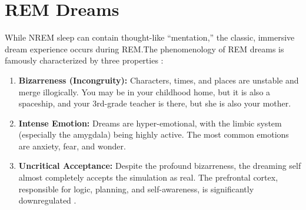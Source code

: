 \section{REM Dreams}\label{sec:rem_dreams}

While NREM sleep can contain thought-like ``mentation,'' the classic, immersive dream experience occurs during REM.\@ The phenomenology of REM dreams is famously characterized by three properties \citep{hobson1977activation}:

\begin{enumerate}
    \item \textbf{Bizarreness (Incongruity):} Characters, times, and places are unstable and merge illogically. You may be in your childhood home, but it is also a spaceship, and your 3rd-grade teacher is there, but she is also your mother.
    \item \textbf{Intense Emotion:} Dreams are hyper-emotional, with the limbic system (especially the amygdala) being highly active. The most common emotions are anxiety, fear, and wonder.
    \item \textbf{Uncritical Acceptance:} Despite the profound bizarreness, the dreaming self almost completely accepts the simulation as real. The prefrontal cortex, responsible for logic, planning, and self-awareness, is significantly downregulated \citep{revonsuo2013important}.
\end{enumerate}
